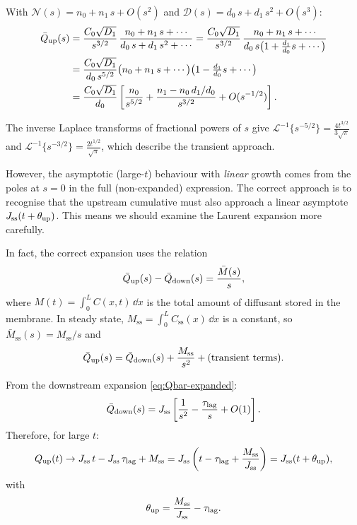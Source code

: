 With $\mathcal{N}(s) = n_0 + n_1\,s + O(s^2)$ and
$\mathcal{D}(s) = d_0\,s + d_1\,s^2 + O(s^3)$:
\begin{align}
  \bar{Q}_{\mathrm{up}}(s)
  &= \frac{C_0\sqrt{D_{1}}}{s^{3/2}}\,
  \frac{n_0 + n_1\,s + \cdots}{d_0\,s + d_1\,s^2 + \cdots}
  = \frac{C_0\sqrt{D_{1}}}{s^{3/2}}\,
  \frac{n_0 + n_1\,s + \cdots}{d_0\,s\bigl(1 + \frac{d_1}{d_0}s
    + \cdots\bigr)}
  \notag\\
  &= \frac{C_0\sqrt{D_{1}}}{d_0\,s^{5/2}}
  \bigl(n_0 + n_1\,s + \cdots\bigr)
  \bigl(1 - \tfrac{d_1}{d_0}s + \cdots\bigr)
  \notag\\
  &= \frac{C_0\sqrt{D_{1}}}{d_0}
  \left[\frac{n_0}{s^{5/2}}
  + \frac{n_1 - n_0\,d_1/d_0}{s^{3/2}} + O(s^{-1/2})\right].
\end{align}

The inverse Laplace transforms of fractional powers of $s$ give
$\mathcal{L}^{-1}\{s^{-5/2}\} = \frac{4t^{3/2}}{3\sqrt{\pi}}$ and
$\mathcal{L}^{-1}\{s^{-3/2}\} = \frac{2t^{1/2}}{\sqrt{\pi}}$, which
describe the transient approach.

However, the asymptotic (large-$t$) behaviour with \emph{linear} growth comes
from the poles at $s=0$ in the full (non-expanded) expression.  The correct
approach is to recognise that the upstream cumulative must also approach a
linear asymptote $J_{\mathrm{ss}}(t + \theta_{\mathrm{up}})$.  This means we should
examine the Laurent expansion more carefully.

In fact, the correct expansion uses the relation
\begin{equation}
  \bar{Q}_{\mathrm{up}}(s) - \bar{Q}_{\mathrm{down}}(s)
  = \frac{\bar{M}(s)}{s},
\end{equation}
where $M(t) = \int_0^L C(x,t)\,\dd{x}$ is the total amount of diffusant
stored in the membrane.  In steady state,
$M_{\mathrm{ss}} = \int_0^L C_{\mathrm{ss}}(x)\,\dd{x}$ is a constant, so
$\bar{M}_{\mathrm{ss}}(s) = M_{\mathrm{ss}}/s$ and
\begin{equation}
  \bar{Q}_{\mathrm{up}}(s)
  = \bar{Q}_{\mathrm{down}}(s) + \frac{M_{\mathrm{ss}}}{s^2}
  + (\text{transient terms}).
\end{equation}

From the downstream expansion \cref{eq:Qbar-expanded}:
\begin{equation}
  \bar{Q}_{\mathrm{down}}(s) = J_{\mathrm{ss}}\left[\frac{1}{s^2}
  - \frac{\tau_{\mathrm{lag}}}{s} + O(1)\right].
\end{equation}
Therefore, for large $t$:
\begin{equation}
  Q_{\mathrm{up}}(t) \to J_{\mathrm{ss}}\,t - J_{\mathrm{ss}}\,\tau_{\mathrm{lag}} + M_{\mathrm{ss}}
  = J_{\mathrm{ss}}\left(t - \tau_{\mathrm{lag}} + \frac{M_{\mathrm{ss}}}{J_{\mathrm{ss}}}\right)
  = J_{\mathrm{ss}}(t + \theta_{\mathrm{up}}),
\end{equation}
with
\begin{equation}
  \label{eq:theta-from-Mss}
  \theta_{\mathrm{up}} = \frac{M_{\mathrm{ss}}}{J_{\mathrm{ss}}} - \tau_{\mathrm{lag}}.
\end{equation}

